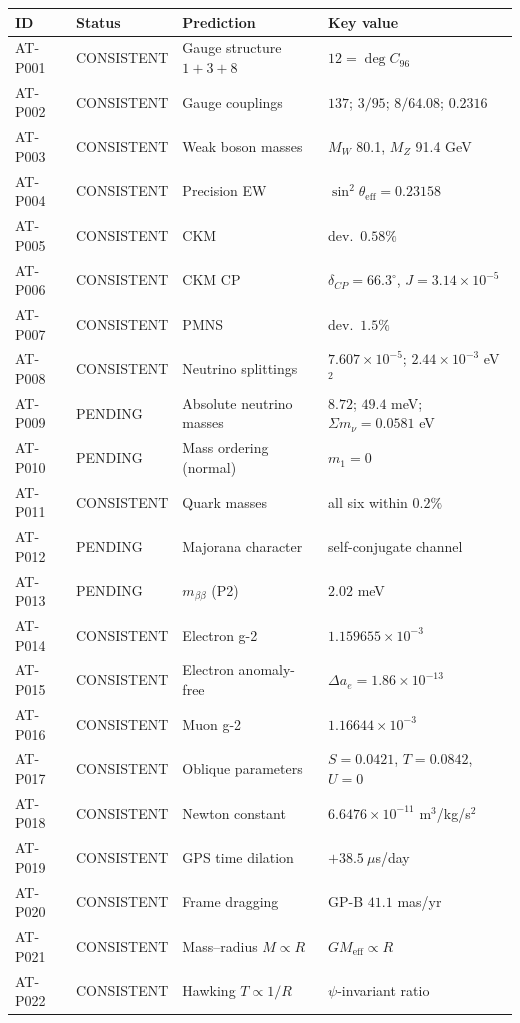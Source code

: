 \documentclass[11pt,a4paper]{article}
\begin{document}
\begin{center}
\begin{tabular}{llp{4.6cm}p{4.2cm}}
\hline
\textbf{ID} & \textbf{Status} & \textbf{Prediction} & \textbf{Key value} \\
\hline
AT-P001 & CONSISTENT & Gauge structure $1+3+8$ & $12 = \deg C_{96}$ \\
AT-P002 & CONSISTENT & Gauge couplings & $137$; $3/95$; $8/64.08$; $0.2316$ \\
AT-P003 & CONSISTENT & Weak boson masses & $M_W$ 80.1, $M_Z$ 91.4 GeV \\
AT-P004 & CONSISTENT & Precision EW & $\sin^2\theta_{\mathrm{eff}}=0.23158$ \\
AT-P005 & CONSISTENT & CKM & dev.\ $0.58\%$ \\
AT-P006 & CONSISTENT & CKM CP & $\delta_{CP}=66.3^\circ$, $J=3.14\times10^{-5}$ \\
AT-P007 & CONSISTENT & PMNS & dev.\ $1.5\%$ \\
AT-P008 & CONSISTENT & Neutrino splittings & $7.607\times10^{-5}$; $2.44\times10^{-3}$ eV$^2$ \\
AT-P009 & PENDING & Absolute neutrino masses & $8.72$; $49.4$ meV; $\Sigma m_\nu=0.0581$ eV \\
AT-P010 & PENDING & Mass ordering (normal) & $m_1=0$ \\
AT-P011 & CONSISTENT & Quark masses & all six within $0.2\%$ \\
AT-P012 & PENDING & Majorana character & self-conjugate channel \\
AT-P013 & PENDING & $m_{\beta\beta}$ (P2) & $2.02$ meV \\
AT-P014 & CONSISTENT & Electron g-2 & $1.159655\times10^{-3}$ \\
AT-P015 & CONSISTENT & Electron anomaly-free & $\Delta a_e = 1.86\times10^{-13}$ \\
AT-P016 & CONSISTENT & Muon g-2 & $1.16644\times10^{-3}$ \\
AT-P017 & CONSISTENT & Oblique parameters & $S=0.0421$, $T=0.0842$, $U=0$ \\
AT-P018 & CONSISTENT & Newton constant & $6.6476\times10^{-11}$ m$^3$/kg/s$^2$ \\
AT-P019 & CONSISTENT & GPS time dilation & $+38.5\ \mu$s/day \\
AT-P020 & CONSISTENT & Frame dragging & GP-B $41.1$ mas/yr \\
AT-P021 & CONSISTENT & Mass--radius $M\propto R$ & $GM_{\mathrm{eff}}\propto R$ \\
AT-P022 & CONSISTENT & Hawking $T\propto 1/R$ & $\psi$-invariant ratio \\

\end{tabular}
\end{center}
\end{document}
